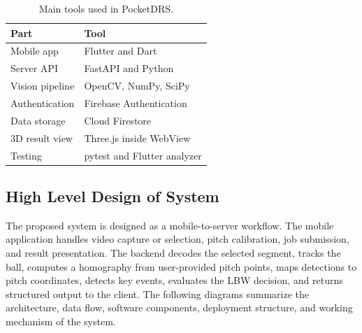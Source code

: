\documentclass[12pt,a4paper]{article}
\begin{document}
\begin{table}[htbp]
\centering
\caption{Main tools used in PocketDRS.}
\label{tab:stack}
\begin{tabularx}{\textwidth}{@{}lX@{}}
\toprule
\textbf{Part} & \textbf{Tool} \\
\midrule
Mobile app & Flutter and Dart \\
Server API & FastAPI and Python \\
Vision pipeline & OpenCV, NumPy, SciPy \\
Authentication & Firebase Authentication \\
Data storage & Cloud Firestore \\
3D result view & Three.js inside WebView \\
Testing & pytest and Flutter analyzer \\
\bottomrule
\end{tabularx}
\end{table}

\subsection{High Level Design of System}

The proposed system is designed as a mobile-to-server workflow. The mobile application handles video capture or selection, pitch calibration, job submission, and result presentation. The backend decodes the selected segment, tracks the ball, computes a homography from user-provided pitch points, maps detections to pitch coordinates, detects key events, evaluates the LBW decision, and returns structured output to the client. The following diagrams summarize the architecture, data flow, software components, deployment structure, and working mechanism of the system.
\end{document}
